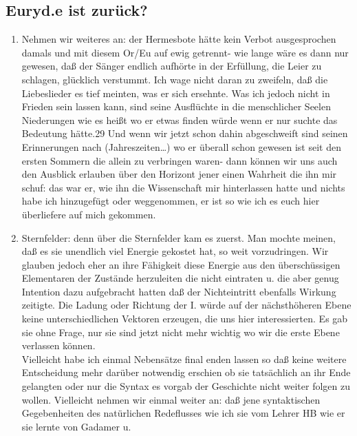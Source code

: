 \documentclass[
]{article}
\author{}
\date{\vspace{-2.5em}}
\providecommand{\tightlist}{%
  \setlength{\itemsep}{0pt}\setlength{\parskip}{0pt}}
\begin{document}
\subsection{Euryd.e ist zurück?}\label{euryd.e-ist-zuruxfcck}

\begin{enumerate}
\def\labelenumi{\alph{enumi}.}
\setcounter{enumi}{1}
\tightlist
\item
  Nehmen wir weiteres an: der Hermesbote hätte kein Verbot ausgesprochen
  damals und mit diesem Or/Eu auf ewig getrennt- wie lange wäre es dann
  nur gewesen, daß der Sänger endlich aufhörte in der Erfüllung, die
  Leier zu schlagen, glücklich verstummt. Ich wage nicht daran zu
  zweifeln, daß die Liebeslieder es tief meinten, was er sich ersehnte.
  Was ich jedoch nicht in Frieden sein lassen kann, sind seine
  Ausflüchte in die menschlicher Seelen Niederungen wie es heißt wo er
  etwas finden würde wenn er nur suchte das Bedeutung hätte.29 Und wenn
  wir jetzt schon dahin abgeschweift sind seinen Erinnerungen nach
  (Jahreszeiten\ldots) wo er überall schon gewesen ist seit den ersten
  Sommern die allein zu verbringen waren- dann können wir uns auch den
  Ausblick erlauben über den Horizont jener einen Wahrheit die ihn mir
  schuf: das war er, wie ihn die Wissenschaft mir hinterlassen hatte und
  nichts habe ich hinzugefügt oder weggenommen, er ist so wie ich es
  euch hier überliefere auf mich gekommen.\\
\item
  Sternfelder: denn über die Sternfelder kam es zuerst. Man mochte
  meinen, daß es sie unendlich viel Energie gekostet hat, so weit
  vorzudringen. Wir glauben jedoch eher an ihre Fähigkeit diese Energie
  aus den überschüssigen Elementaren der Zustände herzuleiten die nicht
  eintraten u. die aber genug Intention dazu aufgebracht hatten daß der
  Nichteintritt ebenfalls Wirkung zeitigte. Die Ladung oder Richtung der
  I. würde auf der nächsthöheren Ebene keine unterschiedlichen Vektoren
  erzeugen, die uns hier interessierten. Es gab sie ohne Frage, nur sie
  sind jetzt nicht mehr wichtig wo wir die erste Ebene verlassen
  können.\\
  Vielleicht habe ich einmal Nebensätze final enden lassen so daß keine
  weitere Entscheidung mehr darüber notwendig erschien ob sie
  tatsächlich an ihr Ende gelangten oder nur die Syntax es vorgab der
  Geschichte nicht weiter folgen zu wollen. Vielleicht nehmen wir einmal
  weiter an: daß jene syntaktischen Gegebenheiten des natürlichen
  Redeflusses wie ich sie vom Lehrer HB wie er sie lernte von Gadamer u.

\end{enumerate}
\end{document}
